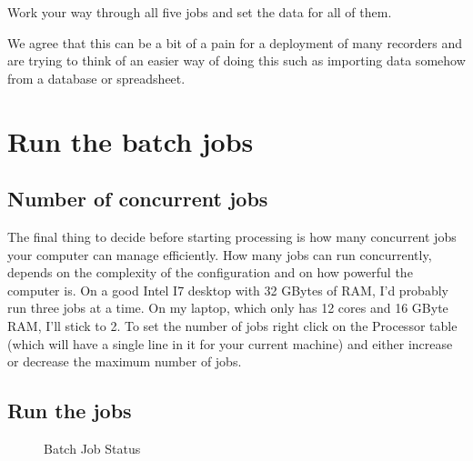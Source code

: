 \documentclass[
]{article}
\begin{document}
Work your way through all five jobs and set the data for all of them.

\begin{tcolorbox}[enhanced jigsaw, coltitle=black, breakable, rightrule=.15mm, colback=white, leftrule=.75mm, opacityback=0, left=2mm, toprule=.15mm, bottomrule=.15mm, arc=.35mm, title=\textcolor{quarto-callout-note-color}{\faInfo}\hspace{0.5em}{Note}, colbacktitle=quarto-callout-note-color!10!white, titlerule=0mm, bottomtitle=1mm, colframe=quarto-callout-note-color-frame, toptitle=1mm, opacitybacktitle=0.6]

We agree that this can be a bit of a pain for a deployment of many
recorders and are trying to think of an easier way of doing this such as
importing data somehow from a database or spreadsheet.

\end{tcolorbox}

\section{Run the batch jobs}\label{run-the-batch-jobs}

\subsection{Number of concurrent jobs}\label{number-of-concurrent-jobs}

The final thing to decide before starting processing is how many
concurrent jobs your computer can manage efficiently. How many jobs can
run concurrently, depends on the complexity of the configuration and on
how powerful the computer is. On a good Intel I7 desktop with 32 GBytes
of RAM, I'd probably run three jobs at a time. On my laptop, which only
has 12 cores and 16 GByte RAM, I'll stick to 2. To set the number of
jobs right click on the Processor table (which will have a single line
in it for your current machine) and either increase or decrease the
maximum number of jobs.

\subsection{Run the jobs}\label{run-the-jobs}

\begin{figure}


\caption{\label{fig-jobstatus}Batch Job Status}

\end{figure}%
\end{document}
